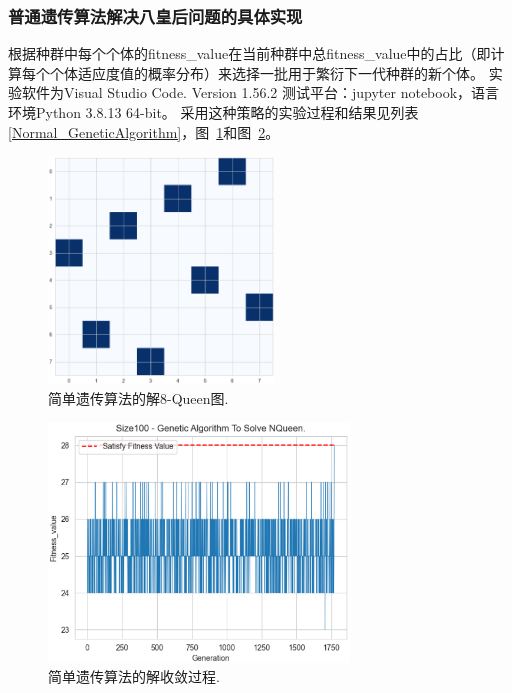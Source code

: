 \documentclass[12pt,a4paper,UTF8]{ctexart}
\begin{document}
\subsubsection{普通遗传算法解决八皇后问题的具体实现} 
根据种群中每个个体的fitness\_value在当前种群中总fitness\_value中的占比（即计算每个个体适应度值的概率分布）来选择一批用于繁衍下一代种群的新个体。
实验软件为Visual Studio Code. Version 1.56.2 测试平台：jupyter notebook，语言环境Python 3.8.13 64-bit。
采用这种策略的实验过程和结果见列表\ref{Normal_GeneticAlgorithm}，图~\ref{fig:简单遗传算法的解8-Queen图}和图~\ref{fig:简单遗传算法的解收敛过程}。

\begin{figure}[htbp]
    \centering
    \includegraphics[width=6cm]{allpicture/queen100normal.eps}
    \caption{简单遗传算法的解8-Queen图.}
    \label{fig:简单遗传算法的解8-Queen图}
\end{figure}
\begin{figure}[htbp]
    \centering
    \includegraphics[width=8cm]{allpicture/generic100normal.eps}
    \caption{简单遗传算法的解收敛过程.}
    \label{fig:简单遗传算法的解收敛过程}
\end{figure}
\end{document}
